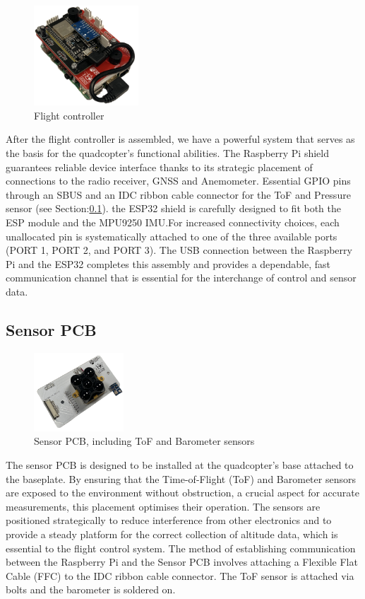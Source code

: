 \documentclass{report}
\begin{document}
\begin{figure}[H]
  \centering
  \includegraphics[width=0.35\textwidth]{Pictures/flight_controller.png}
  \caption{Flight controller}
  \label{fig:flightController2}
\end{figure}
After the flight controller is assembled, we have a powerful system that serves
as the basis for the quadcopter's functional abilities. The Raspberry Pi shield
guarantees reliable device interface thanks to its strategic placement of
connections to the radio receiver, GNSS and Anemometer. Essential GPIO pins
through an SBUS and an IDC ribbon cable connector for the ToF and Pressure
sensor (see Section:\ref{sensorpcb}). the ESP32 shield is carefully  designed to
fit both the ESP module and the MPU9250 IMU.For increased connectivity choices,
each unallocated pin is systematically attached to one of the three available
ports (PORT 1, PORT 2, and PORT 3). The USB connection between the Raspberry Pi
and the ESP32 completes this assembly and provides a dependable, fast
communication channel that is essential for the interchange of control and
sensor data.

\subsection{Sensor PCB}\label{sensorpcb}
\begin{figure}[H]
  \centering
  \includegraphics[width=0.3\textwidth]{Pictures/sensorpcb.png}
  \caption{Sensor PCB, including ToF and Barometer sensors}
  \label{fig:sensorpcb}
\end{figure}
The sensor PCB is designed to be installed at the quadcopter's base attached to
the baseplate. By ensuring that the Time-of-Flight (ToF) and Barometer sensors
are exposed to the environment without obstruction, a crucial aspect for
accurate measurements, this placement optimises their operation. The sensors are
positioned strategically to reduce interference from other electronics and to
provide a steady platform for the correct collection of altitude data, which is
essential to the flight control system. The method of establishing communication
between the Raspberry Pi and the Sensor PCB involves attaching a Flexible Flat
Cable (FFC) to the IDC ribbon cable connector. The ToF sensor is attached via
bolts and the barometer is soldered on.
\end{document}
